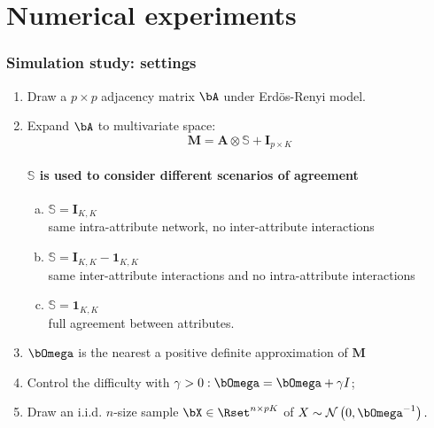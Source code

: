 \section{Numerical experiments}

\begin{frame}
  \frametitle{Simulation study: settings}

  \begin{enumerate}
\item  Draw a $p \times p$ adjacency matrix $\bA$ under Erd\"os-Renyi model.
\item  Expand $\bA$  to  multivariate space: 
  $$\mathbf{M} = \mathbf{A}  \otimes \mathbb{S} + \mathbf{I}_{p\times K}$$
  \paragraph{$\mathbb{S}$ is used to consider different scenarios of agreement}
  \begin{enumerate}[a)]
  \item $\mathbb{S} = \mathbf{I}_{K,K}$ \\ 
    \rsa same intra-attribute network, no inter-attribute interactions
  \item $\mathbb{S} = \mathbf{I}_{K,K} - \mathbf{1}_{K,K}$ \\ 
  \rsa same inter-attribute interactions and no intra-attribute interactions
  \item $\mathbb{S} = \mathbf{1}_{K,K}$ \\
    \rsa full agreement between  attributes.
  \end{enumerate}
\item $\invcov$ is the nearest a positive definite approximation of $\mathbf{M}$
\item Control the difficulty with $\gamma>0: \invcov= \invcov+ \gamma I$;
\item Draw an i.i.d. $n$-size sample $\bX\in\Rset^{n\times pK}$ of
  $X \sim \mathcal{N} \left( 0,\invcov^{-1} \right) .$
\end{enumerate}


\end{frame}

